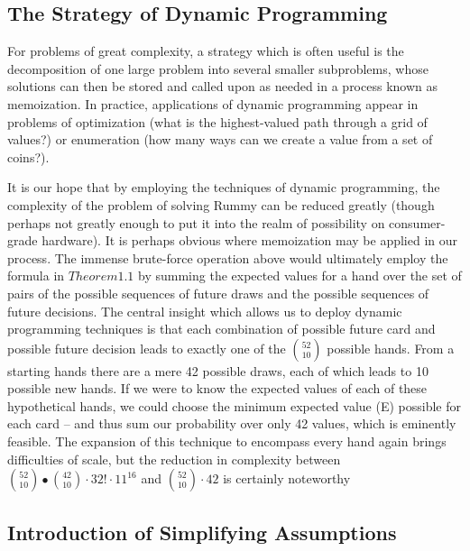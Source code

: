 \documentclass[letter,12pt]{article}
\begin{document}
\subsection{The Strategy of Dynamic Programming}

For problems of great complexity, a strategy which is often useful is the decomposition of one large problem into several smaller subproblems, whose solutions can then be stored and called upon as needed in a process known as memoization. In practice, applications of dynamic programming appear in problems of optimization (what is the highest-valued path through a grid of values?) or enumeration (how many ways can we create a value from a set of coins?). 

It is our hope that by employing the techniques of dynamic programming, the complexity of the problem of solving Rummy can be reduced greatly (though perhaps not greatly enough to put it into the realm of possibility on consumer-grade hardware). It is perhaps obvious where memoization may be applied in our process. The immense brute-force operation above would ultimately employ the formula in $Theorem 1.1$ by summing the expected values for a hand over the set of pairs of the possible sequences of future draws and the possible sequences of future decisions. The central insight which allows us to deploy dynamic programming techniques is that each combination of possible future card and possible future decision leads to exactly one of the $\binom{52}{10}$ possible hands. From a starting hands there are a mere 42 possible draws, each of which leads to 10 possible new hands. If we were to know the expected values of each of these hypothetical hands, we could choose the minimum expected value (E) possible for each card – and thus sum our probability over only 42 values, which is eminently feasible. The expansion of this technique to encompass every hand again brings difficulties of scale, but the reduction in complexity between $\binom{52}{10}∙\binom{42}{10} \cdot 32! \cdot 11^{16}$ and $\binom{52}{10}\cdot42$ is certainly noteworthy

\subsection{Introduction of Simplifying Assumptions}
\end{document}
